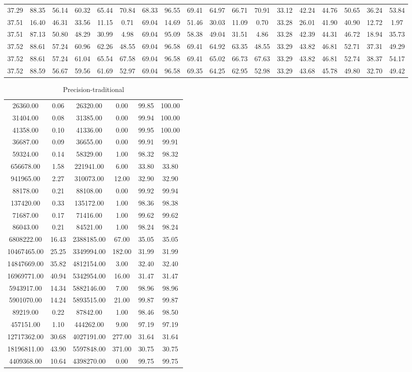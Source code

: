 \begin{table}
\begin{tabular}{cccccccccccccccccc}
37.29& 88.35& 56.14& 60.32& 65.44& 70.84& 68.33& 96.55& 69.41& 64.97& 66.71& 70.91& 33.12& 42.24& 44.76& 50.65& 36.24& 53.84\tabularnewline
37.51& 16.40& 46.31& 33.56& 11.15& 0.71& 69.04& 14.69& 51.46& 30.03& 11.09& 0.70& 33.28& 26.01& 41.90& 40.90& 12.72& 1.97\tabularnewline
37.51& 87.13& 50.80& 48.29& 30.99& 4.98& 69.04& 95.09& 58.38& 49.04& 31.51& 4.86& 33.28& 42.39& 44.31& 46.72& 18.94& 35.73\tabularnewline
37.52& 88.61& 57.24& 60.96& 62.26& 48.55& 69.04& 96.58& 69.41& 64.92& 63.35& 48.55& 33.29& 43.82& 46.81& 52.71& 37.31& 49.29\tabularnewline
37.52& 88.61& 57.24& 61.04& 65.54& 67.58& 69.04& 96.58& 69.41& 65.02& 66.73& 67.63& 33.29& 43.82& 46.81& 52.74& 38.37& 54.17\tabularnewline
37.52& 88.59& 56.67& 59.56& 61.69& 52.97& 69.04& 96.58& 69.35& 64.25& 62.95& 52.98& 33.29& 43.68& 45.78& 49.80& 32.70& 49.42\tabularnewline
\end{tabular}
\end{table}
\begin{table}
\caption{Precision-traditional}
\begin{tabular}{cccccc}
26360.00& 0.06& 26320.00& 0.00& 99.85& 100.00\tabularnewline
31404.00& 0.08& 31385.00& 0.00& 99.94& 100.00\tabularnewline
41358.00& 0.10& 41336.00& 0.00& 99.95& 100.00\tabularnewline
36687.00& 0.09& 36655.00& 0.00& 99.91& 99.91\tabularnewline
59324.00& 0.14& 58329.00& 1.00& 98.32& 98.32\tabularnewline
656678.00& 1.58& 221941.00& 6.00& 33.80& 33.80\tabularnewline
941965.00& 2.27& 310073.00& 12.00& 32.90& 32.90\tabularnewline
88178.00& 0.21& 88108.00& 0.00& 99.92& 99.94\tabularnewline
137420.00& 0.33& 135172.00& 1.00& 98.36& 98.38\tabularnewline
71687.00& 0.17& 71416.00& 1.00& 99.62& 99.62\tabularnewline
86043.00& 0.21& 84521.00& 1.00& 98.24& 98.24\tabularnewline
6808222.00& 16.43& 2388185.00& 67.00& 35.05& 35.05\tabularnewline
10467465.00& 25.25& 3349994.00& 182.00& 31.99& 31.99\tabularnewline
14847669.00& 35.82& 4812154.00& 3.00& 32.40& 32.40\tabularnewline
16969771.00& 40.94& 5342954.00& 16.00& 31.47& 31.47\tabularnewline
5943917.00& 14.34& 5882146.00& 7.00& 98.96& 98.96\tabularnewline
5901070.00& 14.24& 5893515.00& 21.00& 99.87& 99.87\tabularnewline
89219.00& 0.22& 87842.00& 1.00& 98.46& 98.50\tabularnewline
457151.00& 1.10& 444262.00& 9.00& 97.19& 97.19\tabularnewline
12717362.00& 30.68& 4027191.00& 277.00& 31.64& 31.64\tabularnewline
18196811.00& 43.90& 5597848.00& 371.00& 30.75& 30.75\tabularnewline
4409368.00& 10.64& 4398270.00& 0.00& 99.75& 99.75\tabularnewline
\end{tabular}
\end{table}

